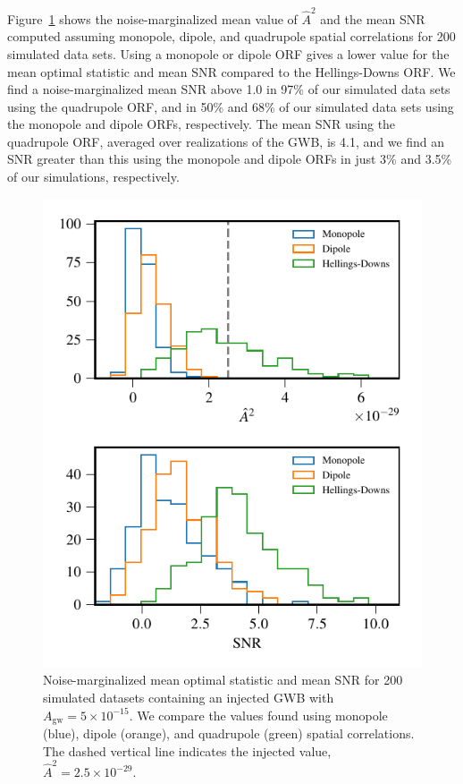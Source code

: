 \documentclass[twocolumn,aps,prd,superscriptaddress]{revtex4-1}
\newcommand{\Agw}{\ensuremath{A_\mathrm{gw}}}
\begin{document}
Figure~\ref{fig:os_ORF} shows the noise-marginalized 
mean value of $\hat{A}^2$ and the mean SNR 
computed assuming monopole, dipole, and quadrupole spatial correlations 
for 200 simulated data sets. Using a monopole or dipole ORF 
gives a lower value for the mean optimal statistic and mean SNR compared to the 
Hellings-Downs ORF. 
We find a noise-marginalized mean SNR above 1.0 in 97\% of our simulated data sets 
using the quadrupole ORF, and in 50\% and 68\% of our simulated data sets 
using the monopole and dipole ORFs, respectively. 
The mean SNR using the quadrupole ORF, averaged over realizations of the GWB, is 4.1, 
and we find an SNR greater than this using the monopole and dipole ORFs in just 
3\% and 3.5\% of our simulations, respectively.
\begin{figure}[t]
	\includegraphics[width=0.95\columnwidth]{plots/optstat_spatial_A5e-15.pdf}
	\caption{Noise-marginalized mean optimal statistic and mean SNR for 200 simulated datasets 
			containing an injected GWB with $\Agw = 5\times10^{-15}$. 
			We compare the values found using monopole (blue), dipole (orange), 
			and quadrupole (green) spatial correlations. 
			The dashed vertical line indicates the injected value, $\hat{A}^2 = 2.5 \times 10^{-29}$.}
	\label{fig:os_ORF}
\end{figure}
\end{document}
